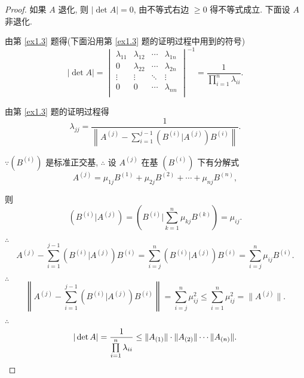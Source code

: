 \documentclass[color=black,device=normal,lang=cn,mode=geye]{elegantnote}
\begin{document}
\begin{proof}
    如果 $A$ 退化, 则 $|\det A|=0$, 由不等式右边 $\geq0$ 得不等式成立. 下面设 $A$ 非退化.

    由第 \ref{ex1.3} 题得(下面沿用第 \ref{ex1.3} 题的证明过程中用到的符号)
    \[|\det A|=\begin{vmatrix}
        \lambda_{11} & \lambda_{12} & \cdots & \lambda_{1n} \\
        0 & \lambda_{22} & \cdots & \lambda_{2n} \\
        \vdots & \vdots & \ddots & \vdots \\
        0 & 0 & \cdots & \lambda_{nn} \\
    \end{vmatrix}^{-1}=\dfrac{1}{\prod\limits_{i=1}^n\lambda_{ii}}.\]

    由第 \ref{ex1.3} 题的证明过程得
    \[\lambda_{jj}=\dfrac{1}{\left\|A^{(j)}-\sum\limits_{i=1}^{j-1}(B^{(i)}|A^{(j)})B^{(i)}\right\|}.\]

    $\because(B^{(i)})$ 是标准正交基, $\therefore$ 设 $A^{(j)}$ 在基 $(B^{(i)})$ 下有分解式
    \[A^{(j)}=\mu_{1j}B^{(1)}+\mu_{2j}B^{(2)}+\cdots+\mu_{nj}B^{(n)},\]

    则
    \[(B^{(i)}|A^{(j)})=\left(B^{(i)}\bigg|\sum\limits_{k=1}^n\mu_{kj}B^{(k)}\right)=\mu_{ij}.\]

    $\therefore$
    \[A^{(j)}-\sum\limits_{i=1}^{j-1}(B^{(i)}|A^{(j)})B^{(i)}=\sum\limits_{i=j}^n(B^{(i)}|A^{(j)})B^{(i)}=\sum\limits_{i=j}^n\mu_{ij}B^{(i)}.\]

    $\therefore$
    \[\left\|A^{(j)}-\sum\limits_{i=1}^{j-1}(B^{(i)}|A^{(j)})B^{(i)}\right\|=\sum\limits_{i=j}^n\mu_{ij}^2\leq\sum\limits_{i=1}^n\mu_{ij}^2=\|A^{(j)}\|.\]

    $\therefore$
    \[|\det A|=\dfrac{1}{\prod\limits_{i=1}^n\lambda_{ii}}\leq\|A_{(1)}\|\cdot\|A_{(2)}\|\cdots\|A_{(n)}\|.\qedhere\]
\end{proof}
\end{document}

